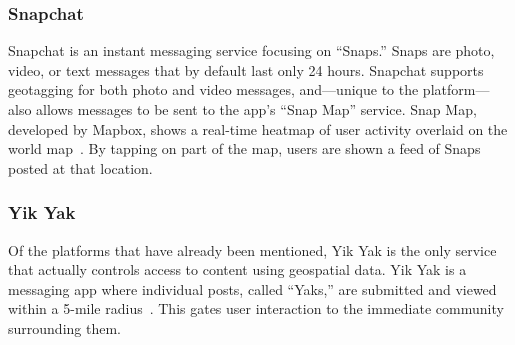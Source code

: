 \subsubsection{Snapchat}

Snapchat is an instant messaging service focusing on \enquote{Snaps.} Snaps are photo, video, or text messages that by default last only 24 hours. Snapchat supports geotagging for both photo and video messages, and—unique to the platform—also allows messages to be sent to the app's \enquote{Snap Map} service. Snap Map, developed by Mapbox, shows a real-time heatmap of user activity overlaid on the world map~\cite{tadesse_2017}. By tapping on part of the map, users are shown a feed of Snaps posted at that location.

\subsubsection{Yik Yak}

Of the platforms that have already been mentioned, Yik Yak is the only service that actually controls access to content using geospatial data. Yik Yak is a messaging app where individual posts, called \enquote{Yaks,} are submitted and viewed within a 5-mile radius~\cite{yikyak_2015}. This gates user interaction to the immediate community surrounding them.
